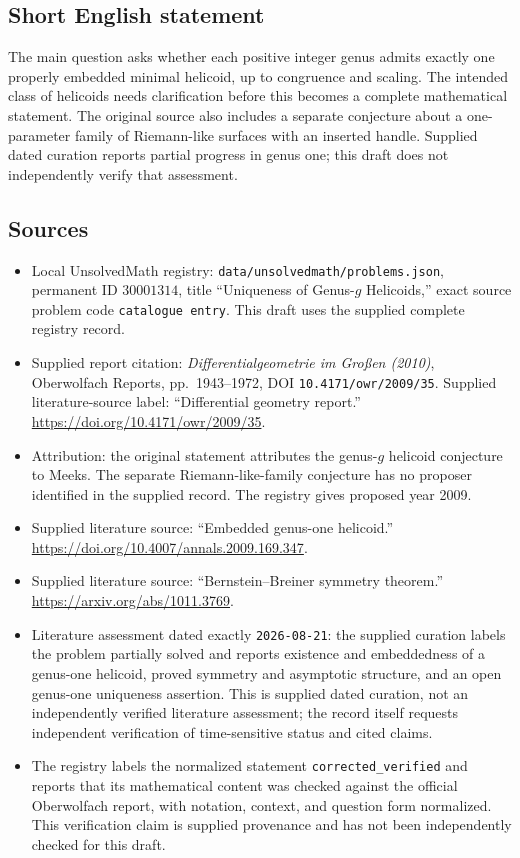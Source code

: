 \documentclass[11pt]{article}
\begin{document}
\subsection{Short English statement}
The main question asks whether each positive integer genus admits exactly one properly embedded minimal helicoid, up to congruence and scaling. The intended class of helicoids needs clarification before this becomes a complete mathematical statement. The original source also includes a separate conjecture about a one-parameter family of Riemann-like surfaces with an inserted handle. Supplied dated curation reports partial progress in genus one; this draft does not independently verify that assessment.
\subsection{Sources}
\begin{itemize}
\item Local UnsolvedMath registry: \texttt{data/unsolvedmath/problems.json}, permanent ID \(30001314\), title ``Uniqueness of Genus-\(g\) Helicoids,'' exact source problem code \texttt{catalogue entry}. This draft uses the supplied complete registry record.
\item Supplied report citation: \emph{Differentialgeometrie im Großen (2010)}, Oberwolfach Reports, pp.\ 1943--1972, DOI \texttt{10.4171/owr/2009/35}. Supplied literature-source label: ``Differential geometry report.'' \url{https://doi.org/10.4171/owr/2009/35}.
\item Attribution: the original statement attributes the genus-\(g\) helicoid conjecture to Meeks. The separate Riemann-like-family conjecture has no proposer identified in the supplied record. The registry gives proposed year 2009.
\item Supplied literature source: ``Embedded genus-one helicoid.'' \url{https://doi.org/10.4007/annals.2009.169.347}.
\item Supplied literature source: ``Bernstein--Breiner symmetry theorem.'' \url{https://arxiv.org/abs/1011.3769}.
\item Literature assessment dated exactly \texttt{2026-08-21}: the supplied curation labels the problem partially solved and reports existence and embeddedness of a genus-one helicoid, proved symmetry and asymptotic structure, and an open genus-one uniqueness assertion. This is supplied dated curation, not an independently verified literature assessment; the record itself requests independent verification of time-sensitive status and cited claims.
\item The registry labels the normalized statement \texttt{corrected\_verified} and reports that its mathematical content was checked against the official Oberwolfach report, with notation, context, and question form normalized. This verification claim is supplied provenance and has not been independently checked for this draft.
\end{itemize}
\end{document}
